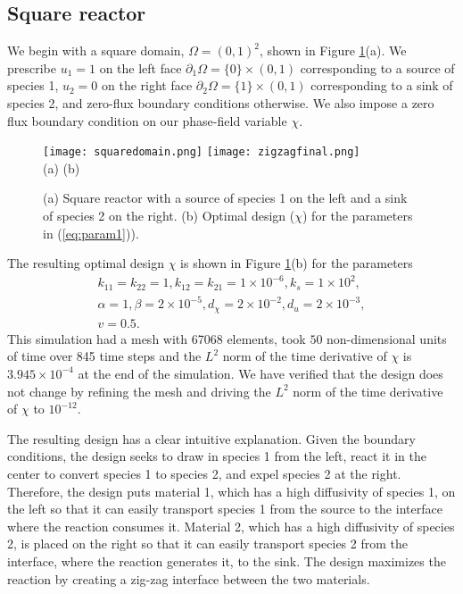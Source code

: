 \documentclass[11pt]{article}
\begin{document}
\subsection{Square reactor}

We begin with a square domain, $\Omega = (0,1)^2$, shown in Figure \ref{fig:square1}(a).  We prescribe $u_1 = 1$ on the left face $\partial_1 \Omega = \{0\} \times (0,1)$ corresponding to a source of species 1, $u_2 = 0$ on the right face $\partial_2 \Omega = \{1\} \times (0,1)$ corresponding to a sink of species 2, and zero-flux boundary conditions otherwise.  We also impose a zero flux boundary condition on our phase-field variable $\chi$.

\begin{figure}
\centering     
    \texttt{[image: squaredomain.png]}
    \texttt{[image: zigzagfinal.png]} \\
    \hspace{-1in}(a)     \hspace{2.7in}(b)
    \caption{(a) Square reactor with a source of species 1 on the left and a sink of species 2 on the right. (b) Optimal design ($\chi$) for the parameters in (\ref{eq:param1})). \label{fig:square1}}
\end{figure}


The resulting optimal design $\chi$ is shown in Figure \ref{fig:square1}(b) for the parameters
\begin{gather}
k_{11} = k_{22} = 1, k_{12} = k_{21}= 1\times10^{-6}, k_s=1\times10^2, \nonumber \\
\alpha = 1,  \beta =  2\times10^{-5}, d_\chi = 2\times10^{-2}, d_u =2\times10^{-3}, \label{eq:param1} \\
v = 0.5. \nonumber
\end{gather}
This simulation had a mesh with 67068 elements, took $50$ non-dimensional units of time over 845 time steps and the $L^2$ norm of the time derivative of $\chi$ is $3.945\times10^{-4}$ at the end of the simulation. We have verified that the design does not change by refining the mesh and driving the $L^2$ norm of the time derivative of $\chi$ to $10^{-12}$.

The resulting design has a clear intuitive explanation.  Given the boundary conditions, the design seeks to draw in species 1 from the left, react it in the center to convert species 1 to species 2, and expel species 2 at the right.   Therefore, the design puts material 1, which has a high diffusivity of species 1, on the left so that it can easily transport species 1 from the source to the interface where the reaction consumes it. Material 2, which has a high diffusivity of species 2, is placed on the right so that it can easily transport species 2 from the interface, where the reaction generates it, to the sink. The design maximizes the reaction by creating a zig-zag interface between the two materials.
\end{document}
